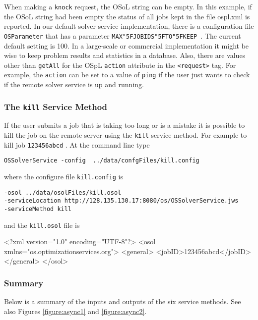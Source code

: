 \documentclass[11pt]{article}
\newcounter{Fig}
\renewcommand{\_}{{\char"5F}}
\renewcommand{\{}{{\char"7B}}
\renewcommand{\}}{{\char"7D}}
\renewcommand{\^}{{\char"0D}}
\renewcommand{\'}{{\char"0D}}
\begin{document}
When making a {\tt knock} request,  the OSoL string can be empty. In this example, if the OSoL string had been empty the status of all jobs kept in the file ospl.xml is reported.  In our default solver service implementation, there is a configuration file {\tt OSParameter} that has a parameter {\tt MAX\_JOBIDS\_TO\_KEEP }.  The current default setting is 100.  In a large-scale or commercial implementation it might be wise to keep problem results and statistics in a database.  Also, there are values other than {\tt getAll} for the OSpL {\tt action} attribute in the {\tt <request>} tag.  For example, the {\tt action} can be set to a value of {\tt ping} if the user just wants to check if the remote solver service is up and running. 



\subsubsection{The  {\tt kill}   Service Method}

If the user submits a job that is taking too long or is a mistake it is possible to kill the job on the remote server using the {\tt kill} service method. For example to kill job {\tt 123456abcd} .  At the command line type
\begin{verbatim}
OSSolverService -config  ../data/confgFiles/kill.config
\end{verbatim}
where the configure file {\tt kill.config} is
\begin{verbatim}
-osol ../data/osolFiles/kill.osol
-serviceLocation http://128.135.130.17:8080/os/OSSolverService.jws
-serviceMethod kill
\end{verbatim}
and the {\tt kill.osol} file is
\begin{verbatimtab}[4]
<?xml version="1.0" encoding="UTF-8"?>
<osol xmlns="os.optimizationservices.org">
 	<general>         
 		<jobID>123456abcd</jobID>  
	</general>
</osol>
\end{verbatimtab}


\subsubsection{Summary}

Below is a summary of the inputs and outputs of the six service methods. See also Figures \ref{figure:async1} and \ref{figure:async2}.
\end{document}
